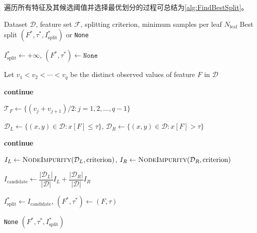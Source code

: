 遍历所有特征及其候选阈值并选择最优划分的过程可总结为\cref{alg:FindBestSplit}。
\begin{algorithm}[H]
	\caption{Find the Best Binary Split}
	\label{alg:FindBestSplit}
	\begin{algorithmic}[1]
		\Require Dataset $\mathcal{D}$, feature set $\mathcal{F}$,
		splitting criterion,
		minimum samples per leaf $N_{\mathrm{leaf}}$
		\Ensure Best split $(F^\ast,\tau^\ast,I_{\mathrm{split}}^\ast)$
		or \texttt{None}
		
		\State $I_{\mathrm{split}}^\ast\gets+\infty$, $(F^\ast,\tau^\ast)\gets\texttt{None}$
		
		\State Let $v_1<v_2<\cdots<v_q$ be the distinct observed values
		of feature $F$ in $\mathcal{D}$
		
		\State \textbf{continue}
		\EndIf
		
		\State $\mathcal{T}_F\gets
		\{(v_j+v_{j+1})/2:j=1,2,\dots,q-1\}$
		
		\State $\mathcal{D}_L\gets
		\{(x,y)\in\mathcal{D}:x[F]\leqslant\tau\}$, 
		$\mathcal{D}_R\gets
		\{(x,y)\in\mathcal{D}:x[F]>\tau\}$
		
		\State \textbf{continue}
		\EndIf
		
		\State $I_L\gets
		\Call{NodeImpurity}{\mathcal{D}_L,\text{criterion}}$, 
		$I_R\gets
		\Call{NodeImpurity}{\mathcal{D}_R,\text{criterion}}$
		
		\State $I_{\mathrm{candidate}}\gets
		\dfrac{|\mathcal{D}_L|}{|\mathcal{D}|}I_L+
		\dfrac{|\mathcal{D}_R|}{|\mathcal{D}|}I_R$
		
		\State $I_{\mathrm{split}}^\ast\gets
		I_{\mathrm{candidate}}$, 
		$(F^\ast,\tau^\ast)\gets(F,\tau)$
		\EndIf
		\EndFor
		\EndFor
		
		\State \Return \texttt{None}
		\Else
		\State \Return
		$(F^\ast,\tau^\ast,I_{\mathrm{split}}^\ast)$
		\EndIf
	\end{algorithmic}
\end{algorithm}
